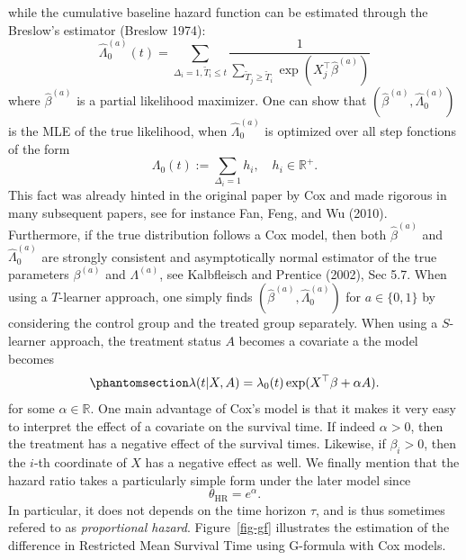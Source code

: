\documentclass[
  11pt,
  a4paper,
]{article}
\theoremstyle{plain}
\theoremstyle{plain}
\theoremstyle{plain}
\theoremstyle{definition}
\theoremstyle{remark}
\begin{document}
while the cumulative baseline hazard function can be estimated through
the Breslow's estimator (Breslow 1974): \[
\widehat\Lambda_0^{(a)}(t) = \sum_{\Delta_i = 1, \widetilde T_i \leqslant t} \frac{1}{\displaystyle\sum_{\widetilde T_j \geqslant\widetilde T_i} \exp(X_j^\top \widehat\beta^{(a)})} 
\] where \(\widehat\beta^{(a)}\) is a partial likelihood maximizer. One
can show that \((\widehat\beta^{(a)},\widehat\Lambda_0^{(a)})\) is the
MLE of the true likelihood, when \(\widehat\Lambda_0^{(a)}\) is
optimized over all step fonctions of the form \[
\Lambda_0(t) := \sum_{\Delta_i=1} h_i, \quad h_i \in \mathbb{R}^+.
\] This fact was already hinted in the original paper by Cox and made
rigorous in many subsequent papers, see for instance Fan, Feng, and Wu
(2010). Furthermore, if the true distribution follows a Cox model, then
both \(\widehat\beta^{(a)}\) and \(\widehat\Lambda_0^{(a)}\) are
strongly consistent and asymptotically normal estimator of the true
parameters \(\beta^{(a)}\) and \(\Lambda^{(a)}\), see Kalbfleisch and
Prentice (2002), Sec 5.7. When using a \(T\)-learner approach, one
simply finds \((\widehat\beta^{(a)},\widehat\Lambda_0^{(a)})\) for
\(a \in \{0,1\}\) by considering the control group and the treated group
separately. When using a \(S\)-learner approach, the treatment status
\(A\) becomes a covariate a the model becomes
\begin{equation}\phantomsection\label{eq-coxslearner}{
\lambda(t|X,A) = \lambda_0(t) \exp(X^\top\beta+\alpha A).
}\end{equation} for some \(\alpha \in \mathbb{R}\). One main advantage
of Cox's model is that it makes it very easy to interpret the effect of
a covariate on the survival time. If indeed \(\alpha > 0\), then the
treatment has a negative effect of the survival times. Likewise, if
\(\beta_i >0\), then the \(i\)-th coordinate of \(X\) has a negative
effect as well. We finally mention that the hazard ratio takes a
particularly simple form under the later model since \[
\theta_{\mathrm{HR}} = e^{\alpha}.
\] In particular, it does not depends on the time horizon \(\tau\), and
is thus sometimes refered to as \emph{proportional hazard}.
Figure~\ref{fig-gf} illustrates the estimation of the difference in
Restricted Mean Survival Time using G-formula with Cox models.
\end{document}
